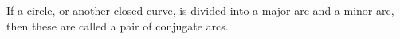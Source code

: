 If a circle, or another closed curve, is divided into a major arc and a minor arc, then
these are called a pair of conjugate arcs.